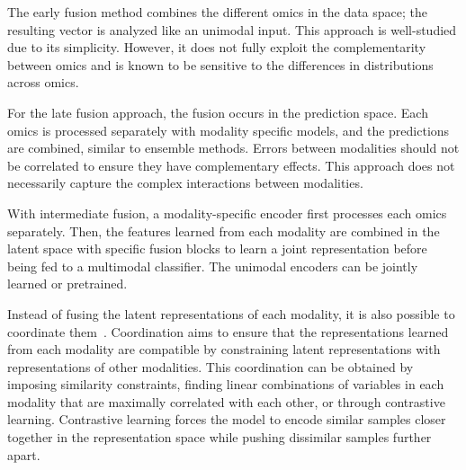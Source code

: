 \documentclass[../main.tex]{subfiles}
\begin{document}
	\begin{description}[%
			style=multiline,
			leftmargin=!,
			labelwidth=2.5cm,
		]
		\item[Early fusion]
			The early fusion method combines the different omics in the data space; the resulting vector is analyzed like an unimodal input.
			This approach is well-studied due to its simplicity.
			However, it does not fully exploit the complementarity between omics and is known to be sensitive to the differences in distributions across omics.
		\item[Late fusion]
			For the late fusion approach, the fusion occurs in the prediction space.
			Each omics is processed separately with modality specific models, and the predictions are combined, similar to ensemble methods.
			Errors between modalities should not be correlated to ensure they have complementary effects.
			This approach does not necessarily capture the complex interactions between modalities.
		\item[Intermediate fusion]
			With intermediate fusion, a modality-specific encoder first processes each omics separately.
			Then, the features learned from each modality are combined in the latent space with specific fusion blocks to learn a joint representation before being fed to a multimodal classifier.
			The unimodal encoders can be jointly learned or pretrained.
	\end{description}
	Instead of fusing the latent representations of each modality, it is also possible to coordinate them~\cite{MML_morency}.
	Coordination aims to ensure that the representations learned from each modality are compatible by constraining latent representations with representations of other modalities.
	This coordination can be obtained by imposing similarity constraints, finding linear combinations of variables in each modality that are maximally correlated with each other, or through contrastive learning.
	Contrastive learning forces the model to encode similar samples closer together in the representation space while pushing dissimilar samples further apart.
\end{document}
